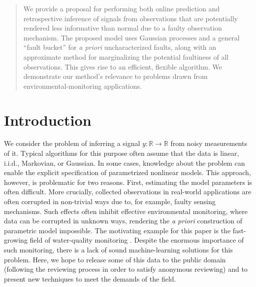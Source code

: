 \documentclass{article}
\newcommand{\R}{\ensuremath{\mathbb{R}}}
\begin{document}

\begin{abstract}
  We provide a proposal for performing both online prediction and
  retrospective inference of signals from observations that are
  potentially rendered less informative than normal due to a faulty
  observation mechanism.  The proposed model uses Gaussian processes
  and a general ``fault bucket'' for \textit{a priori} uncharacterized
  faults, along with an approximate method for marginalizing the
  potential faultiness of all observations. This gives rise to an
  efficient, flexible algorithm. We demonstrate our method's relevance
  to problems drawn from environmental-monitoring
  applications.
\end{abstract}

\section{Introduction}

We consider the problem of inferring a signal $y\colon \R \to \R$ from
noisy measurements of it.  Typical algorithms for this purpose often
assume that the data is linear, i.i.d., Markovian, or Gaussian. In
some cases, knowledge about the problem can enable the explicit
specification of parametrized nonlinear models. This approach,
however, is problematic for two reasons. First, estimating the model
parameters is often difficult. More crucially, collected observations
in real-world applications are often corrupted in non-trivial ways due
to, for example, faulty sensing mechanisms. Such effects often
inhibit effective environmental monitoring, where data can be
corrupted in unknown ways, rendering the \emph{a priori} construction
of parametric model impossible. The motivating example for this paper
is the fast-growing field of water-quality monitoring
\citep{wagner2006guidelines}. Despite the enormous importance of
such monitoring, there is a lack of sound
machine-learning solutions for this problem. Here, we hope to release some of this data to the public domain
(following the reviewing process in order to satisfy anonymous
reviewing) and to present new techniques to meet the
demands of the field.
\end{document}
